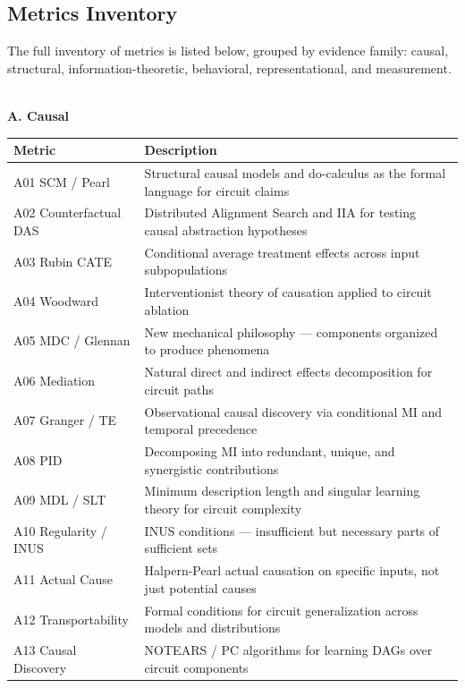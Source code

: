 \documentclass[10pt]{article}
\begin{document}
\subsection{Metrics Inventory}
\label{appendix:metrics}
The full inventory of metrics is listed below, grouped by evidence family: causal,
structural, information-theoretic, behavioral, representational, and measurement. \\
\\
\begingroup
\small
\setlength{\tabcolsep}{4pt}
\renewcommand{\arraystretch}{1.15}


\begingroup
\small
\setlength{\tabcolsep}{4pt}
\renewcommand{\arraystretch}{1.15}
\noindent\textbf{A. Causal}\par
\noindent{}
\nopagebreak

\noindent\begin{tabular}{@{}lp{10cm}@{}}
\toprule
\textbf{Metric} & \textbf{Description} \\
\midrule
A01 SCM / Pearl & Structural causal models and do-calculus as the formal language for circuit claims \\
\midrule
A02 Counterfactual DAS & Distributed Alignment Search and IIA for testing causal abstraction hypotheses \\
\midrule
A03 Rubin CATE & Conditional average treatment effects across input subpopulations \\
\midrule
A04 Woodward & Interventionist theory of causation applied to circuit ablation \\
\midrule
A05 MDC / Glennan & New mechanical philosophy --- components organized to produce phenomena \\
\midrule
A06 Mediation & Natural direct and indirect effects decomposition for circuit paths \\
\midrule
A07 Granger / TE & Observational causal discovery via conditional MI and temporal precedence \\
\midrule
A08 PID & Decomposing MI into redundant, unique, and synergistic contributions \\
\midrule
A09 MDL / SLT & Minimum description length and singular learning theory for circuit complexity \\
\midrule
A10 Regularity / INUS & INUS conditions --- insufficient but necessary parts of sufficient sets \\
\midrule
A11 Actual Cause & Halpern-Pearl actual causation on specific inputs, not just potential causes \\
\midrule
A12 Transportability & Formal conditions for circuit generalization across models and distributions \\
\midrule
A13 Causal Discovery & NOTEARS / PC algorithms for learning DAGs over circuit components \\
\bottomrule
\end{tabular}
\medskip
\end{document}

